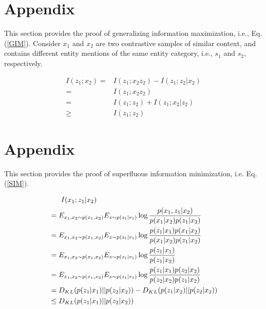 \documentclass[11pt]{article}
\begin{document}



\appendix
\label{appendix}

\section{Appendix}
\label{sec:appendix}
This section provides the proof of generalizing information maximization, i.e., Eq. (\ref{GIM}). Consider $x_1$ and $x_2$ are two contrastive samples of similar context, and contains different entity mentions of the same entity category, i.e., $s_1$ and $s_2$, respectively. 

\begin{equation}
\begin{aligned}
 I(z_1; x_2) =& I(z_1;x_2z_2) - I(z_1;z_2|x_2)\\
=& I(z_1;x_2z_2)\\
=& I(z_1;z_2) + I(z_1;x_2|z_2)\\
\geq& I(z_1;z_2)
\end{aligned}   
\end{equation}



\section{Appendix}
\label{sec:appendix}
This section provides the proof of superfluous information minimization, i.e. Eq. (\ref{SIM}). 

\begin{equation}
\begin{aligned}
&\ \ \ \ \ I(x_1;z_1|x_2) \vspace{4pt}\\
&= E_{x_1,x_2\sim p(x_1,x_2)}E_{z\sim p(z_1|v_1)} \log \frac{p(x_1, z_1|x_2)}{p(x_1|x_2)p(z_1|x_2)}\vspace{8pt}\\
&= E_{x_1,x_2\sim p(x_1,x_2)}E_{z\sim p(z_1|v_1)} \log \frac{p(z_1|x_1)p(x_1|x_2)}{p(x_1|x_2)p(z_1|x_2)} \vspace{8pt}\\
&= E_{x_1,x_2\sim p(x_1,x_2)}E_{z\sim p(z_1|v_1)} \log \frac{p(z_1|x_1)}{p(z_1|x_2)}\vspace{8pt}\\
&= E_{x_1,x_2\sim p(x_1,x_2)}E_{z\sim p(z_1|v_1)} \log \frac{p(z_1|x_1)p(z_2|x_2)}{p(z_2|x_2)p(z_1|x_2)}\vspace{8pt}\\
&= D_{KL}(p(z_1|x_1) || p(z_2|x_2)) \vspace{6pt} - D_{KL}(p(z_1|x_2) || p(z_2|x_2))\vspace{6pt}\\
&\leq D_{KL}(p(z_1|x_1) || p(z_2|x_2)) \vspace{6pt}
\end{aligned}   
\end{equation}
\end{document}
